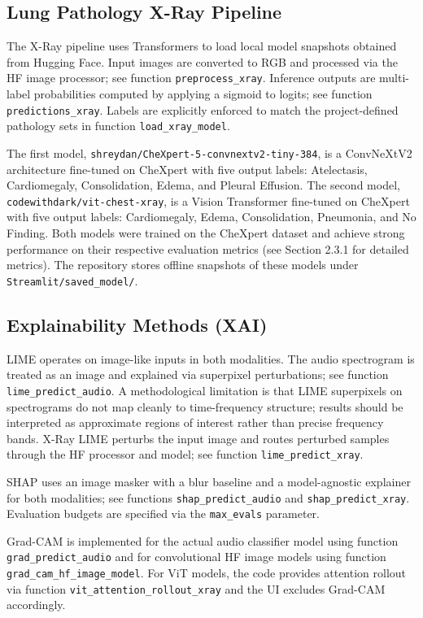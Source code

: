 \documentclass[11pt,a4paper]{article}
\begin{document}
\subsection{Lung Pathology X-Ray Pipeline}
The X-Ray pipeline uses Transformers to load local model snapshots obtained from Hugging Face. Input images are converted to RGB and processed via the HF image processor; see function \texttt{preprocess\_xray}. Inference outputs are multi-label probabilities computed by applying a sigmoid to logits; see function \texttt{predictions\_xray}. Labels are explicitly enforced to match the project-defined pathology sets in function \texttt{load\_xray\_model}.

The first model, \texttt{shreydan/CheXpert-5-convnextv2-tiny-384}, is a ConvNeXtV2 architecture fine-tuned on CheXpert with five output labels: Atelectasis, Cardiomegaly, Consolidation, Edema, and Pleural Effusion. The second model, \texttt{codewithdark/vit-chest-xray}, is a Vision Transformer fine-tuned on CheXpert with five output labels: Cardiomegaly, Edema, Consolidation, Pneumonia, and No Finding. Both models were trained on the CheXpert dataset and achieve strong performance on their respective evaluation metrics (see Section 2.3.1 for detailed metrics). The repository stores offline snapshots of these models under \texttt{Streamlit/saved\_model/}.

\subsection{Explainability Methods (XAI)}
LIME operates on image-like inputs in both modalities. The audio spectrogram is treated as an image and explained via superpixel perturbations; see function \texttt{lime\_predict\_audio}. A methodological limitation is that LIME superpixels on spectrograms do not map cleanly to time-frequency structure; results should be interpreted as approximate regions of interest rather than precise frequency bands. X-Ray LIME perturbs the input image and routes perturbed samples through the HF processor and model; see function \texttt{lime\_predict\_xray}.

SHAP uses an image masker with a blur baseline and a model-agnostic explainer for both modalities; see functions \texttt{shap\_predict\_audio} and \texttt{shap\_predict\_xray}. Evaluation budgets are specified via the \texttt{max\_evals} parameter.

Grad-CAM is implemented for the actual audio classifier model using function \texttt{grad\_predict\_audio} and for convolutional HF image models using function \texttt{grad\_cam\_hf\_image\_model}. For ViT models, the code provides attention rollout via function \texttt{vit\_attention\_rollout\_xray} and the UI excludes Grad-CAM accordingly.
\end{document}
